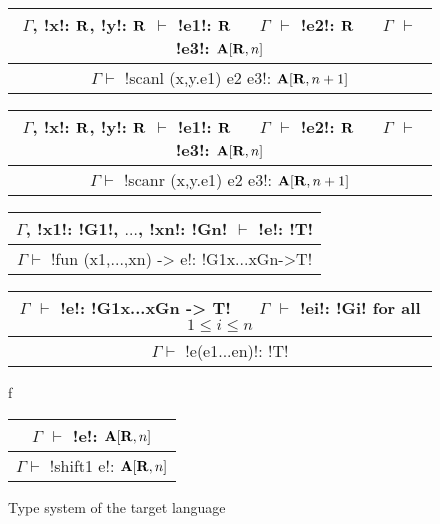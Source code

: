 \begin{figure*}[tb]
    \centering

    \begin{tabular}{c}
        $\Gamma$, !x!: $\mathbf{R}$, !y!: $\mathbf{R}$ $\vdash$ !e1!: $\mathbf{R}$ 
        $\quad$ $\Gamma$ $\vdash$ !e2!: $\mathbf{R}$
        $\quad$ $\Gamma$ $\vdash$ !e3!: $\mathbf{A}[\mathbf{R},n]$
        \\\hline  
        $\Gamma \vdash$ !scanl (x,y.e1) e2 e3!: $\mathbf{A}[\mathbf{R},n+1]$
    \end{tabular}

    \begin{tabular}{c}
        $\Gamma$, !x!: $\mathbf{R}$, !y!: $\mathbf{R}$ $\vdash$ !e1!: $\mathbf{R}$ 
        $\quad$ $\Gamma$ $\vdash$ !e2!: $\mathbf{R}$
        $\quad$ $\Gamma$ $\vdash$ !e3!: $\mathbf{A}[\mathbf{R},n]$
        \\\hline  
        $\Gamma \vdash$ !scanr (x,y.e1) e2 e3!: $\mathbf{A}[\mathbf{R},n+1]$
    \end{tabular}

    \begin{tabular}{c}
        $\Gamma$, !x1!: !G1!, $\ldots$, !xn!: !Gn! $\vdash$ !e!: !T! 
        \\\hline  
        $\Gamma \vdash$ !fun (x1,...,xn) -> e!: !G1x...xGn->T!
    \end{tabular}

    \begin{tabular}{c}
        $\Gamma$ $\vdash$ !e!: !G1x...xGn -> T!
        $\quad$ $\Gamma$ $\vdash$ !ei!: !Gi! for all $1\leq i\leq n$
        \\\hline  
        $\Gamma \vdash$ !e(e1...en)!: !T!
    \end{tabular}f

    \begin{tabular}{c}
        $\Gamma$ $\vdash$ !e!: $\mathbf{A}[\mathbf{R},n]$
        \\\hline  
        $\Gamma \vdash$ !shift1 e!: $\mathbf{A}[\mathbf{R},n]$
    \end{tabular}

    \vspace{-0.2cm}
    \caption{Type system of the target language}
    \vspace{-0.4cm}
    \label{fig:target_typesystem}
    \end{figure*}